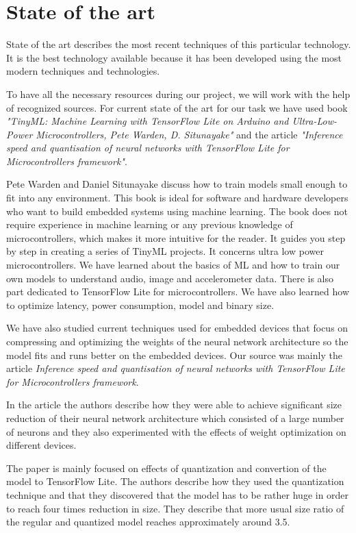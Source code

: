 \documentclass[12pt, letterpaper]{article}
\begin{document}
\section{State of the art}
State of the art describes the most recent techniques of this particular technology. It is the best technology available because it has been developed using the most modern techniques and technologies.

To have all the necessary resources during our project, we will work with the help of recognized sources. For current state of the art for our task we have used book \textit{"TinyML: Machine Learning with TensorFlow Lite on Arduino and Ultra-Low-Power Microcontrollers, Pete Warden, D. Situnayake"} and the article \textit{"Inference speed and quantisation of neural networks with TensorFlow Lite for Microcontrollers framework"}.

Pete Warden and Daniel Situnayake discuss how to train models small enough to fit into any environment. This book is ideal for software and hardware developers who want to build embedded systems using machine learning. The book does not require experience in machine learning or any previous knowledge of microcontrollers, which makes it more intuitive for the reader. It guides you step by step in creating a series of TinyML projects. It concerns ultra low power microcontrollers. We have learned about the basics of ML and how to train our own models to understand audio, image and accelerometer data. There is also part dedicated to TensorFlow Lite for microcontrollers. We have also learned how to optimize latency, power consumption, model and binary size.\cite{tinyml}

We have also studied current techniques used for embedded devices that focus on compressing and optimizing the weights of the neural network architecture so the model fits and runs better on the embedded devices. Our source was mainly the article \textit{Inference speed and quantisation of neural networks with TensorFlow Lite for Microcontrollers framework}.

In the article the authors describe how they were able to achieve significant size reduction of their neural network architecture which consisted of a large number of neurons and they also experimented with the effects of weight optimization on different devices.

The paper is mainly focused on effects of quantization and convertion of the model to TensorFlow Lite. The authors describe how they used the quantization technique and that they discovered that the model has to be rather huge in order to reach four times reduction in size. They describe that more usual size ratio of the regular and quantized model reaches approximately around 3.5.\cite{tflite}
\end{document}
